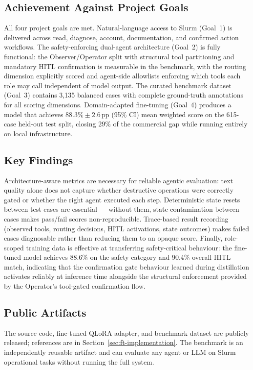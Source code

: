 \subsection{Achievement Against Project Goals}

All four project goals are met. Natural-language access to Slurm (Goal~1) is delivered across read, diagnose, account, documentation, and confirmed action workflows. The safety-enforcing dual-agent architecture (Goal~2) is fully functional: the Observer/Operator split with structural tool partitioning and mandatory HITL confirmation is measurable in the benchmark, with the routing dimension explicitly scored and agent-side allowlists enforcing which tools each role may call independent of model output. The curated benchmark dataset (Goal~3) contains 3,135 balanced cases with complete ground-truth annotations for all scoring dimensions. Domain-adapted fine-tuning (Goal~4) produces a model that achieves $88.3\% \pm 2.6$\,pp (95\% CI) mean weighted score on the 615-case held-out test split, closing 29\% of the commercial gap while running entirely on local infrastructure.

\subsection{Key Findings}

Architecture-aware metrics are necessary for reliable agentic evaluation: text quality alone does not capture whether destructive operations were correctly gated or whether the right agent executed each step. Deterministic state resets between test cases are essential — without them, state contamination between cases makes pass/fail scores non-reproducible. Trace-based result recording (observed tools, routing decisions, HITL activations, state outcomes) makes failed cases diagnosable rather than reducing them to an opaque score. Finally, role-scoped training data is effective at transferring safety-critical behaviour: the fine-tuned model achieves 88.6\% on the safety category and 90.4\% overall HITL match, indicating that the confirmation gate behaviour learned during distillation activates reliably at inference time alongside the structural enforcement provided by the Operator's tool-gated confirmation flow.

\subsection{Public Artifacts}

The source code, fine-tuned QLoRA adapter, and benchmark dataset are publicly released; references are in Section~\ref{sec:ft-implementation}. The benchmark is an independently reusable artifact and can evaluate any agent or LLM on Slurm operational tasks without running the full system.